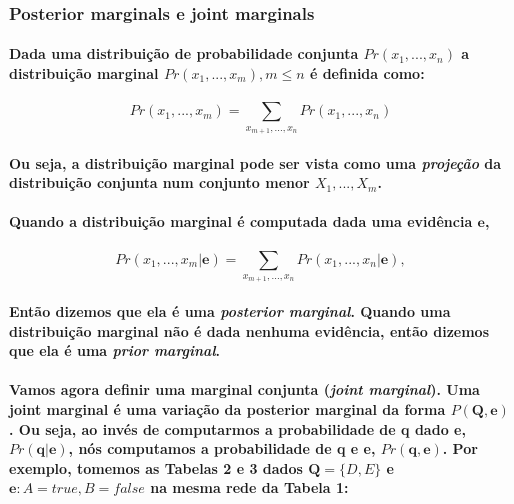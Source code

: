 \documentclass[a4paper,10pt]{article}
\theoremstyle{plain}
\begin{document}
\subsubsection{Posterior marginals e joint marginals}

\paragraph{
  Dada uma distribuição de probabilidade conjunta\cite{project-def} $Pr(x_1,...,x_n)$ a
  distribuição marginal $Pr(x_1,...,x_m), m \leq n$ é definida como:
}

\begin{equation}
  Pr(x_1,...,x_m) = \sum_{x_{m+1},...,x_n} Pr(x_1,...,x_n)
\end{equation}

\paragraph{
  Ou seja, a distribuição marginal pode ser vista como uma \textit{projeção} da distribuição
  conjunta num conjunto menor $X_1,...,X_m$.
}

\paragraph{
  Quando a distribuição marginal é computada dada uma evidência $\textbf{e}$,
}

\begin{equation}
  Pr(x_1,...,x_m|\textbf{e}) = \sum_{x_{m+1},...,x_n} Pr(x_1,...,x_n|\textbf{e}),
\end{equation}

\paragraph{
  Então dizemos que ela é uma \textit{posterior marginal}. Quando uma distribuição marginal não é
  dada nenhuma evidência, então dizemos que ela é uma \textit{prior marginal}.
}

\paragraph{
  Vamos agora definir uma marginal conjunta (\textit{joint marginal}). Uma joint marginal é uma
  variação da posterior marginal da forma $P(\textbf{Q}, \textbf{e})$. Ou seja, ao invés de
  computarmos a probabilidade de \textbf{q} dado \textbf{e}, $Pr(\textbf{q}|\textbf{e})$, nós
  computamos a probabilidade de \textbf{q} e \textbf{e}, $Pr(\textbf{q}, \textbf{e})$. Por exemplo,
  tomemos as Tabelas 2 e 3 dados $\textbf{Q} = \{D, E\}$ e $\textbf{e}: A = true, B = false$ na
  mesma rede da Tabela 1:
}
\end{document}
